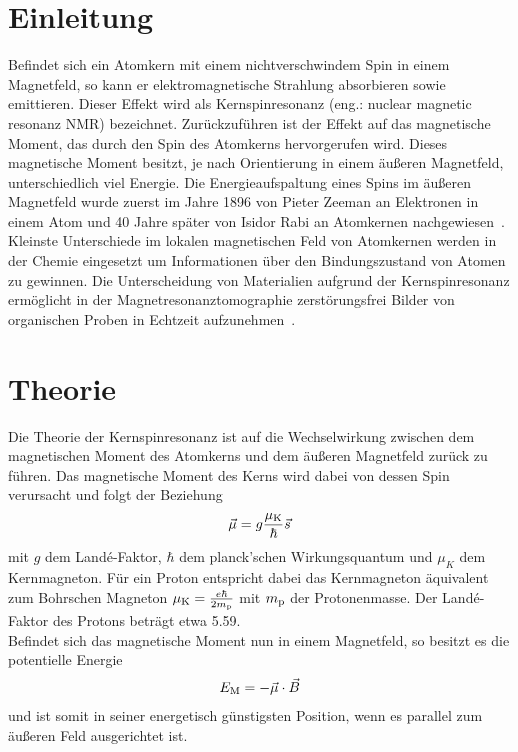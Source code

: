 \documentclass[paper=a4,
	fontsize=10pt,
	DIV=18,
	twocolumn,
	parskip=half
	]{scrartcl}
\numberwithin{equation}{section}    %
\begin{document}
\section{Einleitung}
\label{Einleitung}
%
Befindet sich ein Atomkern mit einem nichtverschwindem Spin in einem Magnetfeld, so kann er elektromagnetische Strahlung absorbieren sowie emittieren. Dieser Effekt wird als Kernspinresonanz (eng.: nuclear magnetic resonanz NMR) bezeichnet.
Zurückzuführen ist der Effekt auf das magnetische Moment, das durch den Spin des Atomkerns hervorgerufen wird. Dieses magnetische Moment besitzt, je nach Orientierung in einem äußeren Magnetfeld, unterschiedlich viel Energie. 
Die Energieaufspaltung eines Spins im äußeren Magnetfeld wurde zuerst im Jahre 1896 von Pieter Zeeman an Elektronen in einem Atom und 40 Jahre später von Isidor Rabi an Atomkernen nachgewiesen~\citep{rabi}.\\
Kleinste Unterschiede im lokalen magnetischen Feld von Atomkernen werden in der Chemie eingesetzt um Informationen über den Bindungszustand von Atomen zu gewinnen. Die Unterscheidung von Materialien aufgrund der Kernspinresonanz ermöglicht in der Magnetresonanztomographie zerstörungsfrei Bilder von organischen Proben in Echtzeit aufzunehmen~\citep{nmr}.


%
\section{Theorie}
\label{Theorie}
%
\label{theorie}
Die Theorie der Kernspinresonanz ist auf die Wechselwirkung zwischen dem magnetischen Moment des Atomkerns und dem äußeren Magnetfeld zurück zu führen.
Das magnetische Moment des Kerns wird dabei von dessen Spin verursacht und folgt der Beziehung
\begin{align}
\vec{\mu}=g \frac{\mu_{\rm K}}{\hbar}\vec{s}
\end{align}
mit $g$ dem Landé-Faktor, $\hbar$ dem planck'schen Wirkungsquantum und $\mu_K$ dem Kernmagneton. Für ein Proton entspricht dabei das Kernmagneton äquivalent zum Bohrschen Magneton $\mu_{\rm K}=\frac{e \hbar}{2m_{\rm p}}$ mit $m_{\rm p}$ der Protonenmasse. Der Landé-Faktor des Protons beträgt etwa 5.59.\\
Befindet sich das magnetische Moment nun in einem Magnetfeld, so besitzt es die potentielle Energie 
\begin{align}
E_{\rm M}=-\vec{\mu} \cdot \vec{B}
\end{align}
und ist somit in seiner energetisch günstigsten Position, wenn es parallel zum äußeren Feld ausgerichtet ist.
\end{document}
